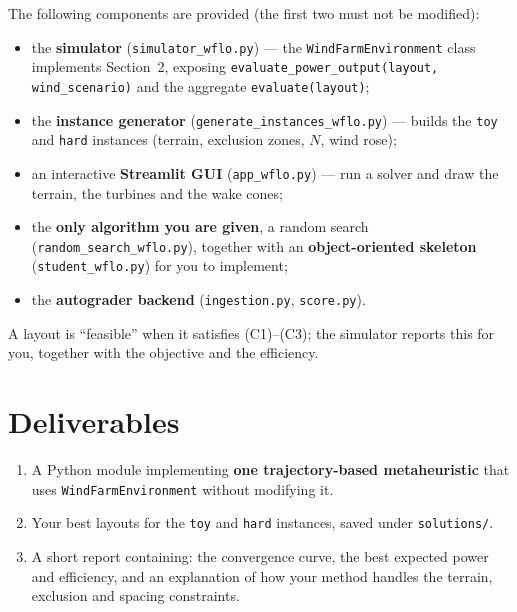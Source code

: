 \documentclass[11pt,a4paper]{article}
\begin{document}
The following components are provided (the first two must not be modified):

\begin{itemize}
  \item the \textbf{simulator} (\texttt{simulator\_wflo.py}) --- the
  \texttt{WindFarmEnvironment} class implements Section~2, exposing
  \texttt{evaluate\_power\_output(layout, wind\_scenario)} and the aggregate
  \texttt{evaluate(layout)};
  \item the \textbf{instance generator}
  (\texttt{generate\_instances\_wflo.py}) --- builds the \texttt{toy} and
  \texttt{hard} instances (terrain, exclusion zones, $N$, wind rose);
  \item an interactive \textbf{Streamlit GUI} (\texttt{app\_wflo.py}) --- run a
  solver and draw the terrain, the turbines and the wake cones;
  \item the \textbf{only algorithm you are given}, a random search
  (\texttt{random\_search\_wflo.py}), together with an \textbf{object-oriented
  skeleton} (\texttt{student\_wflo.py}) for you to implement;
  \item the \textbf{autograder backend} (\texttt{ingestion.py},
  \texttt{score.py}).
\end{itemize}

\begin{center}
\end{center}

A layout is ``feasible'' when it satisfies (C1)--(C3); the simulator reports
this for you, together with the objective and the efficiency.

\section{Deliverables}

\begin{enumerate}
  \item A Python module implementing \textbf{one trajectory-based
  metaheuristic} that uses \texttt{WindFarmEnvironment} without modifying it.
  \item Your best layouts for the \texttt{toy} and \texttt{hard} instances,
  saved under \texttt{solutions/}.
  \item A short report containing: the convergence curve, the best expected
  power and efficiency, and an explanation of how your method handles the
  terrain, exclusion and spacing constraints.
\end{enumerate}
\end{document}

